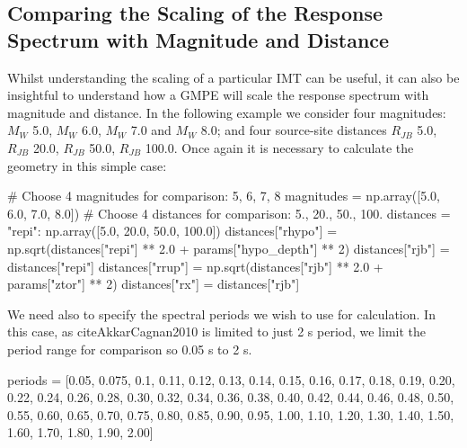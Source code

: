 \subsection{Comparing the Scaling of the Response Spectrum with Magnitude and Distance}

Whilst understanding the scaling of a particular IMT can be useful, it can also be insightful to understand how a GMPE will scale the response spectrum with magnitude and distance. In the following example we consider four magnitudes: $M_W$ 5.0, $M_W$ 6.0, $M_W$ 7.0 and $M_W$ 8.0; and four source-site distances $R_{JB}$ 5.0, $R_{JB}$ 20.0, $R_{JB}$ 50.0, $R_{JB}$ 100.0. Once again it is necessary to calculate the geometry in this simple case:
\begin{python}
# Choose 4 magnitudes for comparison: 5, 6, 7, 8
magnitudes = np.array([5.0, 6.0, 7.0, 8.0])
# Choose 4 distances for comparison: 5., 20., 50., 100.
distances = {"repi": np.array([5.0, 20.0, 50.0, 100.0])}
distances["rhypo"] = np.sqrt(distances["repi"] ** 2.0 +
                             params["hypo_depth"] ** 2)
distances["rjb"] = distances["repi"]
distances["rrup"] = np.sqrt(distances["rjb"] ** 2.0 + 
                            params["ztor"] ** 2)
distances["rx"] = distances["rjb"]
\end{python}

We need also to specify the spectral periods we wish to use for calculation. In this case, as citeAkkarCagnan2010 is limited to just 2 s period, we limit the period range for comparison so 0.05 s to 2 s.

\begin{python}
periods = [0.05, 0.075, 0.1, 0.11, 0.12, 0.13, 0.14, 0.15,
           0.16, 0.17, 0.18, 0.19, 0.20, 0.22, 0.24, 0.26, 
           0.28, 0.30, 0.32, 0.34, 0.36, 0.38, 0.40, 0.42, 
           0.44, 0.46, 0.48, 0.50, 0.55, 0.60, 0.65, 0.70,
           0.75, 0.80, 0.85, 0.90, 0.95, 1.00, 1.10, 1.20, 
           1.30, 1.40, 1.50, 1.60, 1.70, 1.80, 1.90, 2.00]
\end{python}


